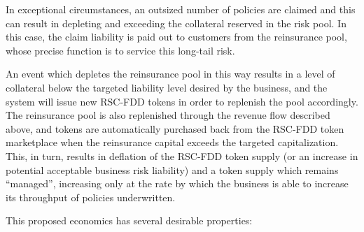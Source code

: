\documentclass[12pt]{article}
\begin{document}
In exceptional circumstances, an outsized number of policies are claimed and this can result in depleting and exceeding the collateral reserved in the risk pool. In this case, the claim liability is paid out to customers from the reinsurance pool, whose precise function is to service this long-tail risk. 

An event which depletes the reinsurance pool in this way results in a level of collateral below the targeted liability level desired by the business, and the system will issue new RSC-FDD tokens in order to replenish the pool accordingly. The reinsurance pool is also replenished through the revenue flow described above, and tokens are automatically purchased back from the RSC-FDD token marketplace when the reinsurance capital exceeds the targeted capitalization. This, in turn, results in deflation of the RSC-FDD token supply (or an increase in potential acceptable business risk liability) and a token supply which remains “managed”, increasing only at the rate by which the business is able to increase its throughput of policies underwritten. 

This proposed economics has several desirable properties:
\end{document}
